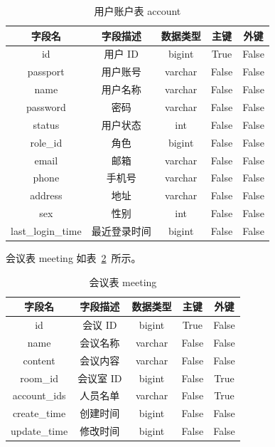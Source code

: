 \documentclass{izdthesis}
\begin{document}
\begin{table}[htbp]
  \centering
  \caption{用户账户表 account}
  \label{tab:4-1}
  \songti
  \begin{tabular}{|c|c|c|c|c|}
    \hline
    字段名 & 字段描述 & 数据类型 & 主键 & 外键 \\
    \hline
    id & 用户 ID & bigint & True & False \\
    \hline
    passport & 用户账号 & varchar & False & False \\
    \hline
    name & 用户名称 & varchar & False & False \\
    \hline
    password & 密码 & varchar & False & False \\
    \hline
    status & 用户状态 & int & False & False \\
    \hline
    role\_id & 角色 & bigint & False & False \\
    \hline
    email & 邮箱 & varchar & False & False \\
    \hline
    phone & 手机号 & varchar & False & False \\
    \hline
    address & 地址 & varchar & False & False \\
    \hline
    sex & 性别 & int & False & False \\
    \hline
    last\_login\_time & 最近登录时间 & bigint & False & False \\
    \hline
  \end{tabular}
\end{table}

会议表 meeting 如表~\ref{tab:4-2}~所示。

\begin{table}[htbp]
  \centering
  \caption{会议表 meeting}
  \label{tab:4-2}
  \songti
  \begin{tabular}{|c|c|c|c|c|}
    \hline
    字段名 & 字段描述 & 数据类型 & 主键 & 外键 \\
    \hline
    id & 会议 ID & bigint & True & False \\
    \hline
    name & 会议名称 & varchar & False & False \\
    \hline
    content & 会议内容 & varchar & False & False \\
    \hline
    room\_id & 会议室 ID & bigint & False & True \\
    \hline
    account\_ids & 人员名单 & varchar & False & True \\
    \hline
    create\_time & 创建时间 & bigint & False & False \\
    \hline
    update\_time & 修改时间 & bigint & False & False \\
    \hline
  \end{tabular}
\end{table}
\end{document}
